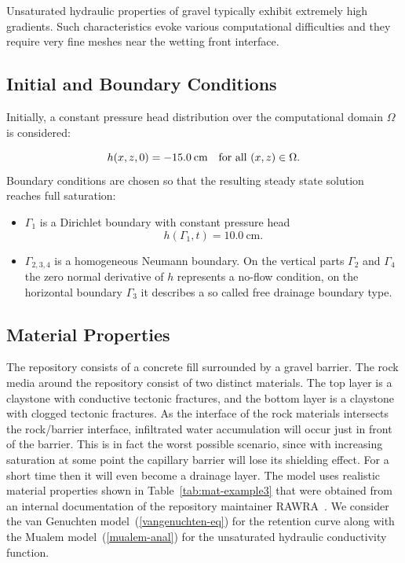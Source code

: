 \documentclass[final,3p,times,twocolumn]{elsarticle}
\begin{document}
Unsaturated hydraulic properties of gravel typically exhibit
extremely high gradients. Such characteristics evoke various 
computational difficulties and they require very fine meshes 
near the wetting front interface.




\subsection{Initial and Boundary Conditions}

Initially, a constant pressure head distribution over the computational domain $\Omega$ is considered:

\begin{equation}\label{ic3}
h(x,z,0) = -15.0 \hspace{0.75mm}\mbox{cm} \quad \mbox{for all } (x, z) \in \Omega.
\end{equation}
Boundary conditions are chosen so that the resulting steady state solution reaches full saturation:  

\begin{itemize}
\item $\Gamma_1$ is a Dirichlet boundary with constant pressure head $$h(\Gamma_1,t) = 10.0 \ \mbox{cm}.$$ 
\item $\Gamma_{2,3,4}$ is a homogeneous Neumann boundary. 
On the vertical parts $\Gamma_2$ and $\Gamma_4$ the zero normal derivative of $h$ 
represents a no-flow condition, on the horizontal boundary $\Gamma_3$ it describes a so called 
free drainage boundary type. %
\end{itemize}

\subsection{Material Properties}

The repository consists of a concrete fill surrounded by a gravel barrier. 
The rock media around the repository consist of two distinct materials. The 
top layer is a claystone with conductive tectonic fractures, and the bottom 
layer is a claystone  with clogged tectonic fractures. As the interface of 
the rock materials intersects the rock/barrier interface, infiltrated water 
accumulation will occur just in front of the barrier. This is in fact the worst 
possible scenario, since with increasing saturation at some point the capillary 
barrier will lose its shielding effect. For a short time then it will even become a 
drainage layer. The model uses realistic material 
properties shown in Table~\ref{tab:mat-example3} that were obtained from an
internal documentation of the repository maintainer RAWRA~\cite{rawra}. 
We consider the van Genuchten model~(\ref{vangenuchten-eq}) for the retention 
curve along with the Mualem model~(\ref{mualem-anal}) for the unsaturated hydraulic 
conductivity function.
\end{document}

